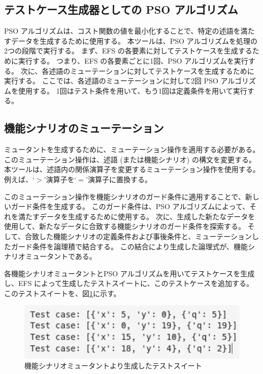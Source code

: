 \documentclass[uplatex, twocolumn, 10pt]{jsarticle} %
\begin{document}
\subsection{テストケース生成器としての PSO アルゴリズム}
PSO アルゴリズムは、コスト関数の値を最小化することで、特定の述語を満たすデータを生成するために使用する。
本ツールは、PSO アルゴリズムを処理の2つの段階で実行する。
まず、EFS の各要素に対してテストケースを生成するために実行する。
つまり、EFS の各要素ごとに1回、PSO アルゴリズムを実行する。
次に、各述語のミューテーションに対してテストケースを生成するために実行する。
ここでは、各述語のミューテーションに対して2回 PSO アルゴリズムを使用する。
1回はテスト条件を用いて、もう1回は定義条件を用いて実行する。

\subsection{機能シナリオのミューテーション}
ミュータントを生成するために、ミューテーション操作を適用する必要がある。
このミューテーション操作は、述語 (または機能シナリオ) の構文を変更する。
本ツールは、述語内の関係演算子を変更するミューテーション操作を使用する。
例えば、`$>$'演算子を`$=$'演算子に置換する。

このミューテーション操作を機能シナリオのガード条件に適用することで、新しいガード条件を生成する。
このガード条件は、PSO アルゴリズムによって、それを満たすデータを生成するために使用する。
次に、生成した新たなデータを使用して、新たなデータに合致する機能シナリオのガード条件を探索する。
そして、合致した機能シナリオの定義条件および事後条件と、ミューテーションしたガード条件を論理積で結合する。
この結合により生成した論理式が、機能シナリオミュータントである。

各機能シナリオミュータントとPSO アルゴリズムを用いてテストケースを生成し、EFS によって生成したテストスイートに、このテストケースを追加する。
このテストスイートを、図\ref{fig:Test_suite_generated_with_functional_scenatios_mutants}に示す。

\begin{figure}[tp]
    \begin{center}
        \includegraphics[width=\linewidth]{../image/Automatic_Generation_of_Test/Test_suite_generated_with_functional_scenatios_mutants.png}
        \caption{機能シナリオミュータントより生成したテストスイート}
        \label{fig:Test_suite_generated_with_functional_scenatios_mutants}
    \end{center}
\end{figure}
\end{document}
